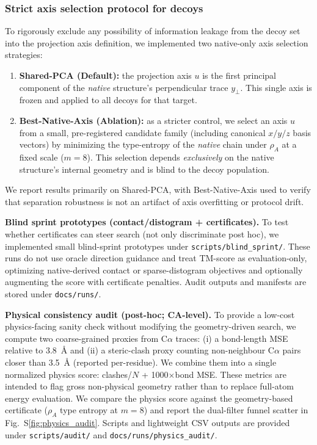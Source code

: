 \subsubsection*{Strict axis selection protocol for decoys}
To rigorously exclude any possibility of information leakage from the decoy set into the projection axis definition, we implemented two native-only axis selection strategies:
\begin{enumerate}
    \item \textbf{Shared-PCA (Default):} the projection axis $u$ is the first principal component of the \textit{native} structure's perpendicular trace $y_{\perp}$. This single axis is frozen and applied to all decoys for that target.
    \item \textbf{Best-Native-Axis (Ablation):} as a stricter control, we select an axis $u$ from a small, pre-registered candidate family (including canonical $x/y/z$ basis vectors) by minimizing the type-entropy of the \textit{native} chain under $\rho_A$ at a fixed scale ($m=8$). This selection depends \textit{exclusively} on the native structure's internal geometry and is blind to the decoy population.
\end{enumerate}
We report results primarily on Shared-PCA, with Best-Native-Axis used to verify that separation robustness is not an artifact of axis overfitting or protocol drift.

\textbf{Blind sprint prototypes (contact/distogram + certificates).} To test whether certificates can steer search (not only discriminate post hoc), we implemented small blind-sprint prototypes under \texttt{scripts/blind\_sprint/}. These runs do not use oracle direction guidance and treat TM-score as evaluation-only, optimizing native-derived contact or sparse-distogram objectives and optionally augmenting the score with certificate penalties. Audit outputs and manifests are stored under \texttt{docs/runs/}.

\textbf{Physical consistency audit (post-hoc; CA-level).} To provide a low-cost physics-facing sanity check without modifying the geometry-driven search, we compute two coarse-grained proxies from C$\alpha$ traces: (i) a bond-length MSE relative to 3.8~\AA{} and (ii) a steric-clash proxy counting non-neighbour C$\alpha$ pairs closer than 3.5~\AA{} (reported per-residue). We combine them into a single normalized physics score: clashes/$N$ + 1000$\times$bond MSE. These metrics are intended to flag gross non-physical geometry rather than to replace full-atom energy evaluation. We compare the physics score against the geometry-based certificate ($\rho_A$ type entropy at $m=8$) and report the dual-filter funnel scatter in Fig.~S\ref{fig:physics_audit}. Scripts and lightweight CSV outputs are provided under \texttt{scripts/audit/} and \texttt{docs/runs/physics\_audit/}.

